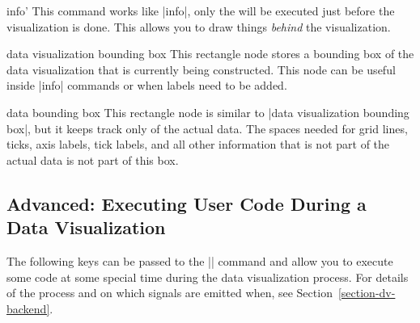 \begin{datavisualizationoperation}{info'}{}
    This command works like |info|, only the  will be executed just
    before the visualization is done. This allows you to draw things
    \emph{behind} the visualization.
\begin{codeexample}[preamble={\usetikzlibrary{datavisualization.formats.functions}}]
\end{codeexample}
\end{datavisualizationoperation}

\label{section-dv-bounding-box}%
\begin{predefinednode}{data visualization bounding box}
    This rectangle node stores a bounding box of the data visualization that is
    currently being constructed. This node can be useful inside |info| commands
    or when labels need to be added.
\end{predefinednode}

\begin{predefinednode}{data bounding box}
    This rectangle node is similar to |data visualization bounding box|, but it
    keeps track only of the actual data. The spaces needed for grid lines,
    ticks, axis labels, tick labels, and all other information that is not part
    of the actual data is not part of this box.
\end{predefinednode}


\subsection{Advanced: Executing User Code During a Data Visualization}
\label{section-dv-user-code}

The following keys can be passed to the |\datavisualization| command and allow
you to execute some code at some special time during the data visualization
process. For details of the process and on which signals are emitted when, see
Section~\ref{section-dv-backend}.

